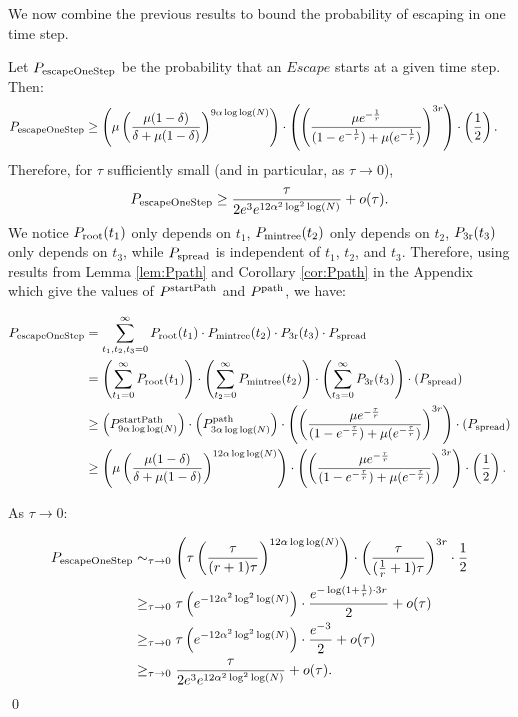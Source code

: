 We now combine the previous results to bound the probability of escaping in one time step.

\begin{lemma} \label{lem:Pescape}
Let $P_{\rm escapeOneStep}$ be the probability that an $Escape$ starts at a given time step. Then:
\begin{align*}
P_{\rm escapeOneStep} &\geq \left(\mu \left(\frac{\mu (1-\delta)}{\delta + \mu (1-\delta)} \right)^{9\alpha\log\log(N)} \right) \cdot \left(\left(\frac{\mu e^{-\frac{1}{r}}}{(1-e^{-\frac{1}{r}}) + \mu (e^{-\frac{1}{r}})} \right)^{3r}\right)\cdot \left(\frac{1}{2} \right).
\end{align*}
Therefore, for $\tau$ sufficiently small (and in particular, as $\tau \to 0$),
$$P_{\rm escapeOneStep} \geq  \frac{\tau}{2e^3e^{12\alpha^2\log^2\log(N)}} +o(\tau).  $$
\proof We notice $P_{\rm root}(t_1)$ only depends on $t_1$, $P_{\rm mintree}(t_2)$ only depends on $t_2$, $P_{\rm 3r}(t_3)$ only depends on $t_3$, while $P_{\rm spread}$ is independent of $t_1$, $t_2$, and $t_3$. Therefore, using results from Lemma \ref{lem:Ppath} and Corollary \ref{cor:Ppath} in the Appendix which give the values of $P^{\rm startPath}$ and $P^{\rm path}$, we have:

\begin{align*}
P_{\rm escapeOneStep} &= \displaystyle\sum_{t_1, t_2, t_3 = 0}^{\infty} P_{\rm root}(t_1) \cdot  P_{\rm mintree}(t_2)  \cdot  P_{\rm 3r}(t_3) \cdot  P_{\rm spread}  \\
&= \left(\sum_{t_1= 0}^{\infty} P_{\rm root}(t_1) \right)\cdot \left(\sum_{t_2= 0}^{\infty} P_{\rm mintree}(t_2) \right) \cdot \left(\sum_{t_3 = 0}^{\infty}  P_{\rm 3r}(t_3)\right)\cdot \left(P_{\rm spread} \right) \\
&\geq \left(P^{\rm startPath}_{9\alpha\log\log(N)} \right)\cdot \left(P^{\rm path}_{3\alpha\log\log(N)} \right)\cdot \left(\left(\frac{\mu e^{-\frac{\tau}{r}}}{(1-e^{-\frac{\tau}{r}}) + \mu (e^{-\frac{\tau}{r}})} \right)^{3r}\right) \cdot \left(P_{\rm spread} \right) \\
&\geq \left(\mu\left(\frac{\mu (1-\delta)}{\delta + \mu (1-\delta)} \right)^{12\alpha\log\log(N)} \right)\cdot \left(\left(\frac{\mu e^{-\frac{\tau}{r}}}{(1-e^{-\frac{\tau}{r}}) + \mu (e^{-\frac{\tau}{r}})} \right)^{3r}\right)\cdot \left(\frac{1}{2} \right).
\end{align*}

 As $\tau \to 0$:

\begin{align*}
P_{\rm escapeOneStep} &\sim_{\tau \to 0}  \left(\tau \left(\frac{\tau }{(r+1)\tau} \right)^{12\alpha\log\log(N)} \right)\cdot \left(\frac{\tau}{(\frac{1}{r} + 1) \tau} \right)^{3r}\cdot \frac{1}{2}  \\
&\geq_{\tau \to 0} \tau  \left(e^{-12\alpha^2\log^2\log(N)} \right)\cdot \frac{e^{-\log(1+ \frac{1}{r})\cdot 3r}}{2} +o(\tau) \\
&\geq_{\tau \to 0} \tau  \left(e^{-12\alpha^2\log^2\log(N)} \right) \cdot \frac{e^{-3}}{2} +o(\tau) \\
&\geq_{\tau \to 0} \frac{\tau}{2e^3e^{12\alpha^2\log^2\log(N)}} +o(\tau).
\end{align*} 
\qed 
\end{lemma}

